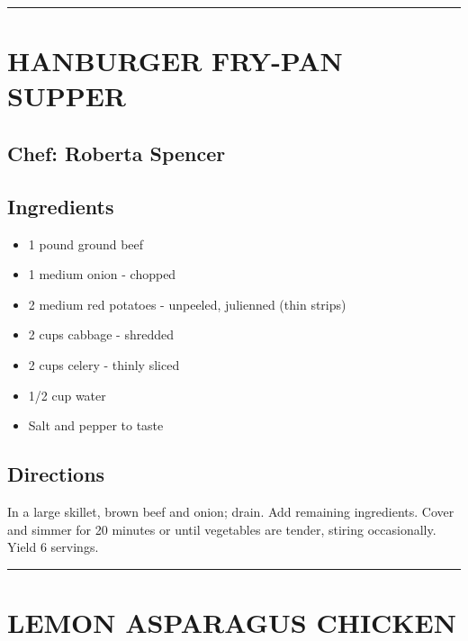 \documentclass[
]{book}
\providecommand{\tightlist}{%
  \setlength{\itemsep}{0pt}\setlength{\parskip}{0pt}}
\begin{document}
\begin{center}\rule{0.5\linewidth}{0.5pt}\end{center}

\hypertarget{hanburger-fry-pan-supper}{%
\section*{HANBURGER FRY-PAN SUPPER}\label{hanburger-fry-pan-supper}}


\hypertarget{chef-roberta-spencer-20}{%
\subsection*{Chef: Roberta Spencer}\label{chef-roberta-spencer-20}}


\hypertarget{ingredients-59}{%
\subsection*{Ingredients}\label{ingredients-59}}


\begin{itemize}
\tightlist
\item
  1 pound ground beef
\item
  1 medium onion - chopped
\item
  2 medium red potatoes - unpeeled, julienned (thin strips)
\item
  2 cups cabbage - shredded
\item
  2 cups celery - thinly sliced
\item
  1/2 cup water
\item
  Salt and pepper to taste
\end{itemize}

\hypertarget{directions-59}{%
\subsection*{Directions}\label{directions-59}}


In a large skillet, brown beef and onion; drain. Add remaining ingredients. Cover and simmer for 20 minutes or until vegetables are tender, stiring occasionally. Yield 6 servings.

\begin{center}\rule{0.5\linewidth}{0.5pt}\end{center}

\hypertarget{lemon-asparagus-chicken}{%
\section*{LEMON ASPARAGUS CHICKEN}\label{lemon-asparagus-chicken}}
\end{document}
